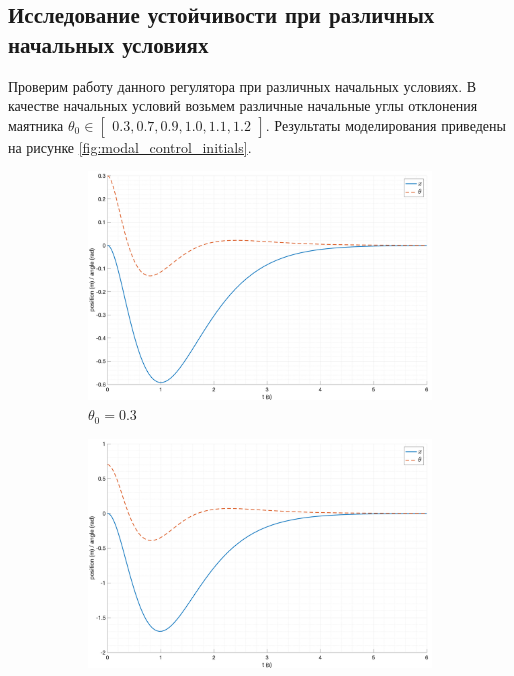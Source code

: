 \subsection{Исследование устойчивости при различных начальных условиях}
Проверим работу данного регулятора при различных начальных условиях. 
В качестве начальных условий возьмем различные начальные углы отклонения маятника $\theta_0 \in \begin{bmatrix}0.3, 0.7, 0.9, 1.0, 1.1, 1.2\end{bmatrix}$. Результаты 
моделирования приведены на рисунке \ref{fig:modal_control_initials}. 
\begin{figure}[ht!]
    \centering
    \begin{subfigure}[b]{0.45\textwidth}
        \includegraphics[width=\textwidth]{media/plots/modal_control/modal_control_out_1.png}
        \caption{$\theta_0 = 0.3$}
    \end{subfigure}
    \begin{subfigure}[b]{0.45\textwidth}
        \includegraphics[width=\textwidth]{media/plots/modal_control/modal_control_out_2.png}

\end{subfigure}
\end{figure}

